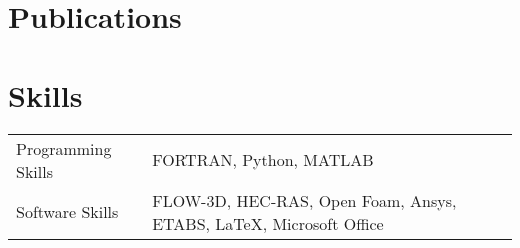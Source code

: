 \documentclass[a4paper,12pt]{article}
\begin{document}
\section{Publications}
\begin{refsection}
\nocite{*}
\printbibliography[heading=none]
\end{refsection}

\section{Skills}
\begin{tabularx}{\linewidth}{@{}l X@{}}
Programming Skills &  \normalsize{FORTRAN, Python, MATLAB}\\
Software Skills  &  \normalsize{FLOW-3D, HEC-RAS, Open Foam, Ansys, ETABS,  \LaTeX , Microsoft Office }\\ 

\end{tabularx}

\vfill
{}
\end{document}
